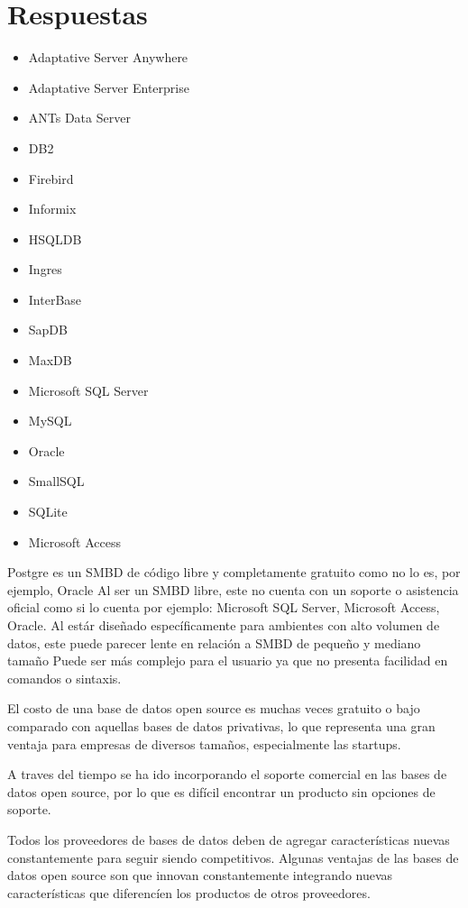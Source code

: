 \documentclass{exam}
\begin{document}
\section*{Respuestas}
\begin{questions}
	\question 
	\begin{itemize}
		\item Adaptative Server Anywhere
		\item Adaptative Server Enterprise
		\item ANTs Data Server
		\item DB2
		\item Firebird
		\item Informix
		\item HSQLDB
		\item Ingres
		\item InterBase
		\item SapDB
		\item MaxDB
		\item Microsoft SQL Server
		\item MySQL
		\item Oracle
		\item SmallSQL
		\item SQLite
		\item Microsoft Access
	\end{itemize}
	
	\question Postgre es un SMBD de código libre y completamente gratuito como no lo es, por ejemplo, Oracle
	Al ser un SMBD libre, este no cuenta con un soporte o asistencia oficial como si lo cuenta por ejemplo: Microsoft SQL Server, Microsoft Access, Oracle.
	Al estár diseñado específicamente para ambientes con alto volumen de datos, este puede parecer lente en relación a SMBD de pequeño y mediano tamaño
	Puede ser más complejo para el usuario ya que no presenta facilidad en comandos o sintaxis.
	
	
	\question El costo de una base de datos open source es muchas veces gratuito o bajo comparado con aquellas bases de datos privativas, lo que representa una gran ventaja para empresas de diversos tamaños, especialmente las startups.

A traves del tiempo se ha ido incorporando el soporte comercial en las bases de datos open source, por lo que es difícil encontrar un producto sin opciones de soporte.

Todos los proveedores de bases de datos deben de agregar características nuevas constantemente para seguir siendo competitivos. Algunas ventajas de las bases de datos open source son que innovan constantemente integrando nuevas características que diferencíen los productos de otros proveedores.


\end{questions}
\end{document}
